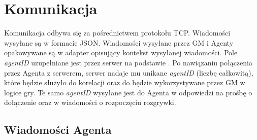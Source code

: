 \documentclass[Dokumentacja.tex]{subfiles}
\begin{document}
\section{Komunikacja}
Komunikacja odbywa się za pośrednictwem protokołu TCP. Wiadomości wysyłane są w formacie JSON.
Wiadomości wysyłane przez GM i Agenty opakowywane są w adapter opisujący kontekst wysyłanej wiadomości.
Pole \textit{agentID} uzupełniane jest przez serwer na podstawie . Po nawiązaniu połączenia przez Agenta z serwerem,
serwer nadaje mu unikane \textit{agentID} (liczbę całkowitą), które będzie służyło do korelacji oraz do będzie
wykorzystywane przez GM w logice gry. Te samo \textit{agentID} wysyłane jest do Agenta w odpowiedzi na prośbę o dołączenie
oraz w wiadomości o rozpoczęciu rozgrywki.


\subsection{Wiadomości Agenta}









\end{document}
